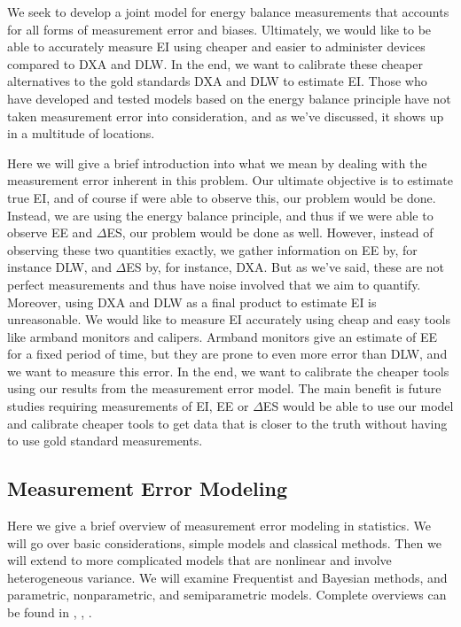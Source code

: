 \documentclass[11pt]{article}\usepackage[]{graphicx}\usepackage[]{color}
\begin{document}
We seek to develop a joint model for energy balance measurements that accounts for all forms of measurement error and biases. Ultimately, we would like to be able to accurately measure EI using cheaper and easier to administer devices compared to DXA and DLW. In the end, we want to calibrate these cheaper alternatives to the gold standards DXA and DLW to estimate EI. Those who have developed and tested models based on the energy balance principle have not taken measurement error into consideration, and as we've discussed, it shows up in a multitude of locations. 


Here we will give a brief introduction into what we mean by dealing with the measurement error inherent in this problem. Our ultimate objective is to estimate true EI, and of course if were able to observe this, our problem would be done. Instead, we are using the energy balance principle, and thus if we were able to observe EE and $\Delta$ES, our problem would be done as well. However, instead of observing these two quantities exactly, we gather information on EE by, for instance DLW, and $\Delta$ES by, for instance, DXA. But as we've said, these are not perfect measurements and thus have noise involved that we aim to quantify. Moreover, using DXA and DLW as a final product to estimate EI is unreasonable. We would like to measure EI accurately using cheap and easy tools like armband monitors and calipers. Armband monitors give an estimate of EE for a fixed period of time, but they are prone to even more error than DLW, and we want to measure this error. In the end, we want to calibrate the cheaper tools using our results from the measurement error model. The main benefit is future studies requiring measurements of EI, EE or $\Delta$ES would be able to use our model and calibrate cheaper tools to get data that is closer to the truth without having to use gold standard measurements.



\subsection{Measurement Error Modeling}

Here we give a brief overview of measurement error modeling in statistics. We will go over basic considerations, simple models and classical methods. Then we will extend to more complicated models that are nonlinear and involve heterogeneous variance. We will examine Frequentist and Bayesian methods, and parametric, nonparametric, and semiparametric models. Complete overviews can be found in \cite{linear}, \cite{nonlinear}, \cite{buzas}.
\end{document}
